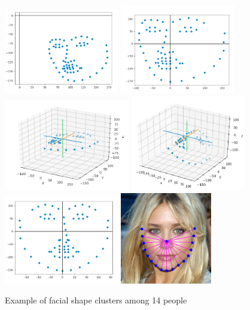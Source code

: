 \documentclass{article}
\begin{document}
\begin{figure}[ht]
  \centering
  \includegraphics[width=5cm]{images/dots_transformation/dots1.png}
  \includegraphics[width=5cm]{images/dots_transformation/dots2.png}
  \includegraphics[width=5.5cm]{images/dots_transformation/dots3.png}
  \includegraphics[width=5cm]{images/dots_transformation/dots4.png}
  \includegraphics[width=5cm]{images/dots_transformation/dots5.png}
  \includegraphics[width=4cm]{images/dots_transformation/dots6.png}
  \caption{Example of facial shape clusters among 14 people}
  \label{fig:dlib_example}
\end{figure}
\end{document}
